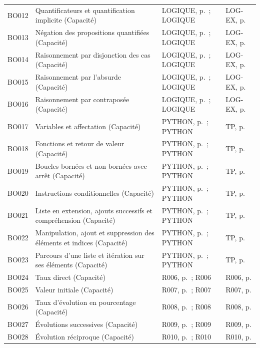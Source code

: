 \begin{longtable}{p{.1\linewidth}p{.43\linewidth}p{.19\linewidth}p{.16\linewidth}}
BO012 & Quantificateurs et quantification implicite (Capacité) & LOGIQUE, p.\,\pageref{LOGIQUE} ; LOGIQUE & LOG-EX, p.\,\pageref{LOG-EX} \\
BO013 & Négation des propositions quantifiées (Capacité) & LOGIQUE, p.\,\pageref{LOGIQUE} ; LOGIQUE & LOG-EX, p.\,\pageref{LOG-EX} \\
BO014 & Raisonnement par disjonction des cas (Capacité) & LOGIQUE, p.\,\pageref{LOGIQUE} ; LOGIQUE & LOG-EX, p.\,\pageref{LOG-EX} \\
BO015 & Raisonnement par l’absurde (Capacité) & LOGIQUE, p.\,\pageref{LOGIQUE} ; LOGIQUE & LOG-EX, p.\,\pageref{LOG-EX} \\
BO016 & Raisonnement par contraposée (Capacité) & LOGIQUE, p.\,\pageref{LOGIQUE} ; LOGIQUE & LOG-EX, p.\,\pageref{LOG-EX} \\
BO017 & Variables et affectation (Capacité) & PYTHON, p.\,\pageref{PYTHON} ; PYTHON & TP, p.\,\pageref{TP} \\
BO018 & Fonctions et retour de valeur (Capacité) & PYTHON, p.\,\pageref{PYTHON} ; PYTHON & TP, p.\,\pageref{TP} \\
BO019 & Boucles bornées et non bornées avec arrêt (Capacité) & PYTHON, p.\,\pageref{PYTHON} ; PYTHON & TP, p.\,\pageref{TP} \\
BO020 & Instructions conditionnelles (Capacité) & PYTHON, p.\,\pageref{PYTHON} ; PYTHON & TP, p.\,\pageref{TP} \\
BO021 & Liste en extension, ajouts successifs et compréhension (Capacité) & PYTHON, p.\,\pageref{PYTHON} ; PYTHON & TP, p.\,\pageref{TP} \\
BO022 & Manipulation, ajout et suppression des éléments et indices (Capacité) & PYTHON, p.\,\pageref{PYTHON} ; PYTHON & TP, p.\,\pageref{TP} \\
BO023 & Parcours d’une liste et itération sur ses éléments (Capacité) & PYTHON, p.\,\pageref{PYTHON} ; PYTHON & TP, p.\,\pageref{TP} \\
BO024 & Taux direct (Capacité) & R006, p.\,\pageref{R006} ; R006 & R006, p.\,\pageref{R006} \\
BO025 & Valeur initiale (Capacité) & R007, p.\,\pageref{R007} ; R007 & R007, p.\,\pageref{R007} \\
BO026 & Taux d’évolution en pourcentage (Capacité) & R008, p.\,\pageref{R008} ; R008 & R008, p.\,\pageref{R008} \\
BO027 & Évolutions successives (Capacité) & R009, p.\,\pageref{R009} ; R009 & R009, p.\,\pageref{R009} \\
BO028 & Évolution réciproque (Capacité) & R010, p.\,\pageref{R010} ; R010 & R010, p.\,\pageref{R010} \\

\end{longtable}
